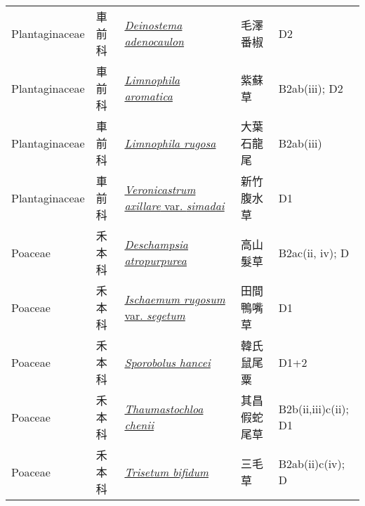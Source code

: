 {\begin{longtable}{p{2.5cm}p{2.5cm}p{4.5cm}p{2.5cm}p{3cm}}
    Plantaginaceae & 車前科 & \href{http://www.theplantlist.org/tpl1.1/search?q=Deinostema+adenocaulon}{\textit{Deinostema adenocaulon} } & 毛澤番椒 & D2 \index{Deinostema@\textit{Deinostema}!adenocaulon@\textit{adenocaulon}}  \index{毛澤番椒} \\
    Plantaginaceae & 車前科 & \href{http://www.theplantlist.org/tpl1.1/search?q=Limnophila+aromatica}{\textit{Limnophila aromatica} } & 紫蘇草 & B2ab(iii); D2 \index{Limnophila@\textit{Limnophila}!aromatica@\textit{aromatica}}  \index{紫蘇草} \\
    Plantaginaceae & 車前科 & \href{http://www.theplantlist.org/tpl1.1/search?q=Limnophila+rugosa}{\textit{Limnophila rugosa} } & 大葉石龍尾 & B2ab(iii) \index{Limnophila@\textit{Limnophila}!rugosa@\textit{rugosa}}  \index{大葉石龍尾} \\
    Plantaginaceae & 車前科 & \href{http://www.theplantlist.org/tpl1.1/search?q=Veronicastrum+axillare+var.+simadai}{\textit{Veronicastrum axillare} var. \textit{simadai} } & 新竹腹水草 & D1 \index{Veronicastrum@\textit{Veronicastrum}!axillare@\textit{axillare}!var. simadai@var. \textit{simadai}}  \index{新竹腹水草} \\
    Poaceae & 禾本科 & \href{http://www.theplantlist.org/tpl1.1/search?q=Deschampsia+atropurpurea}{\textit{Deschampsia atropurpurea} } & 高山髮草 & B2ac(ii, iv); D \index{Deschampsia@\textit{Deschampsia}!atropurpurea@\textit{atropurpurea}}  \index{高山髮草} \\
    Poaceae & 禾本科 & \href{http://www.theplantlist.org/tpl1.1/search?q=Ischaemum+rugosum+var.+segetum}{\textit{Ischaemum rugosum} var. \textit{segetum} } & 田間鴨嘴草 & D1 \index{Ischaemum@\textit{Ischaemum}!rugosum@\textit{rugosum}!var. segetum@var. \textit{segetum}}  \index{田間鴨嘴草} \\
    Poaceae & 禾本科 & \href{http://www.theplantlist.org/tpl1.1/search?q=Sporobolus+hancei}{\textit{Sporobolus hancei} } & 韓氏鼠尾粟 & D1+2 \index{Sporobolus@\textit{Sporobolus}!hancei@\textit{hancei}}  \index{韓氏鼠尾粟} \\
    Poaceae & 禾本科 & \href{http://www.theplantlist.org/tpl1.1/search?q=Thaumastochloa+chenii}{\textit{Thaumastochloa chenii} } & 其昌假蛇尾草 & B2b(ii,iii)c(ii); D1 \index{Thaumastochloa@\textit{Thaumastochloa}!chenii@\textit{chenii}}  \index{其昌假蛇尾草} \\
    Poaceae & 禾本科 & \href{http://www.theplantlist.org/tpl1.1/search?q=Trisetum+bifidum}{\textit{Trisetum bifidum} } & 三毛草 & B2ab(ii)c(iv); D \index{Trisetum@\textit{Trisetum}!bifidum@\textit{bifidum}}  \index{三毛草} \\

\end{longtable}}
